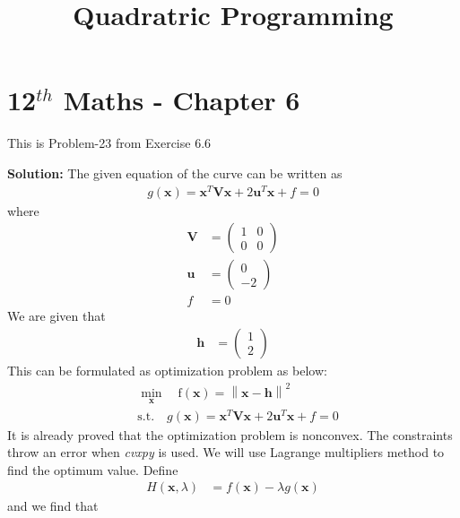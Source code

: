 \documentclass[12pt]{article}
\providecommand{\brak}[1]{\ensuremath{\left(#1\right)}}
\providecommand{\norm}[1]{\left\lVert#1\right\rVert}
\newcommand{\solution}{\noindent \textbf{Solution: }}
\newcommand{\myvec}[1]{\ensuremath{\begin{pmatrix}#1\end{pmatrix}}}
\let\vec\mathbf
\begin{document}
\begin{center}
	\title{\textbf{Quadratric Programming}}
\date{\vspace{-5ex}} %
\maketitle
\end{center}
\setcounter{page}{1}

\section{12$^{th}$ Maths - Chapter 6}
This is Problem-23 from Exercise 6.6 
\begin{enumerate}

\solution 
\fi
The given equation of the curve can be written as  
\begin{align}
	\label{eq:12/6/6/23/lagmul/parabolaEq2}
	g\brak{\vec{x}} = \vec{x}^T\vec{V}\vec{x} + 2\vec{u}^T\vec{x} + f = 0 
\end{align}
where
\begin{align}
	\label{eq:12/6/6/23/lagmul/eqV}
	\vec{V} &= \myvec{ 1 & 0 \\ 0 & 0} \\
	\label{eq:12/6/6/23/lagmul/eqU}
	\vec{u} &= \myvec{0 \\ -2} \\
	\label{eq:12/6/6/23/lagmul/eqF}
	f &= 0 
\end{align}
We are given that 
\begin{align}
	\vec{h} &= \myvec{1 \\ 2}
\end{align}
This can be formulated as optimization problem as below:
\begin{align}
	\label{eq:12/6/6/23/lagmul/Eq3}
	&  \min_{\vec{x}} \quad \text{f}\brak{\vec{x}} = \norm{\vec{x}-\vec{h}}^2\\
	\label{eq:12/6/6/23/lagmul/Eq4}
	& \text{s.t.}\quad g\brak{\vec{x}} = \vec{x}^T\vec{V}\vec{x} + 2\vec{u}^T\vec{x} + f = 0  
\end{align}
It is already proved that the optimization problem is nonconvex. The constraints throw an error when \textit{cvxpy} is used. 
We will use Lagrange multipliers method to find the optimum value. Define
\begin{align}
	H\brak{\vec{x}, \lambda} &= f\brak{\vec{x}} - \lambda g\brak{\vec{x}} 
\end{align}
and we find that 
\begin{align}

\end{align}
\end{enumerate}
\end{document}
